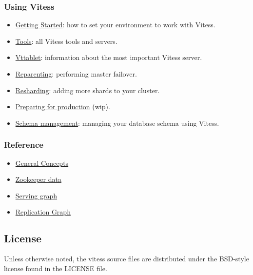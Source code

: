 \subsubsection{Using Vitess}\hypertarget{using-vitess}{}\label{using-vitess}

\begin{itemize}
\item \href{https://github.com/youtube/vitess/blob/master/doc/GettingStarted.markdown}{Getting Started}:
  how to set your environment to work with Vitess.
\item \href{https://github.com/youtube/vitess/blob/master/doc/Tools.markdown}{Tools}:
  all Vitess tools and servers.
\item \href{https://github.com/youtube/vitess/blob/master/doc/Vttablet.markdown}{Vttablet}:
  information about the most important Vitess server.
\item \href{https://github.com/youtube/vitess/blob/master/doc/Reparenting.markdown}{Reparenting}:
  performing master failover.
\item \href{https://github.com/youtube/vitess/blob/master/doc/Resharding.markdown}{Resharding}:
  adding more shards to your cluster.
\item \href{https://github.com/youtube/vitess/blob/master/doc/Production.markdown}{Preparing for production} (wip).
\item \href{https://github.com/youtube/vitess/blob/master/doc/SchemaManagement.markdown}{Schema management}:
  managing your database schema using Vitess.
\end{itemize}

\subsubsection{Reference}\hypertarget{reference}{}\label{reference}

\begin{itemize}
\item \href{https://github.com/youtube/vitess/blob/master/doc/Concepts.markdown}{General Concepts}
\item \href{https://github.com/youtube/vitess/blob/master/doc/ZookeeperData.markdown}{Zookeeper data}
\item \href{https://github.com/youtube/vitess/blob/master/doc/ServingGraph.markdown}{Serving graph}
\item \href{https://github.com/youtube/vitess/blob/master/doc/ReplicationGraph.markdown}{Replication Graph}
\end{itemize}

\subsection{License}\hypertarget{license}{}\label{license}

Unless otherwise noted, the vitess source files are distributed
under the BSD-style license found in the LICENSE file.


